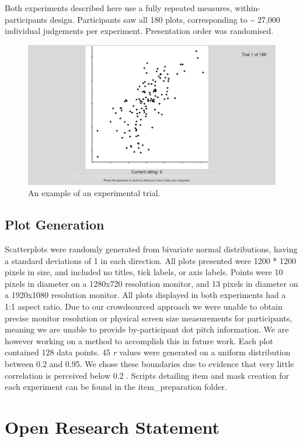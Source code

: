 \documentclass[preprint, 3p,
authoryear]{elsarticle} %
\begin{document}
Both experiments described here use a fully repeated measures,
within-participants design. Participants saw all 180 plots,
corresponding to \textasciitilde{} 27,000 individual judgements per
experiment. Presentation order was randomised.

\begin{figure}

\includegraphics[width=0.5\linewidth]{images/example-trial} \hfill{}

\caption{\label{example-trial}An example of an experimental trial.}\label{fig:example-trial}
\end{figure}

\hypertarget{plot-generation}{%
\subsection{Plot Generation}\label{plot-generation}}

Scatterplots were randomly generated from bivariate normal
distributions, having a standard deviations of 1 in each direction. All
plots presented were 1200 * 1200 pixels in size, and included no titles,
tick labels, or axis labels. Points were 10 pixels in diameter on a
1280x720 resolution monitor, and 13 pixels in diameter on a 1920x1080
resolution monitor. All plots displayed in both experiments had a 1:1
aspect ratio. Due to our crowdsourced approach we were unable to obtain
precise monitor resolution or physical screen size measurements for
participants, meaning we are unable to provide by-participant dot pitch
information. We are however working on a method to accomplish this in
future work. Each plot contained 128 data points. 45 \emph{r} values
were generated on a uniform distribution between 0.2 and 0.95. We chose
these boundaries due to evidence that very little correlation is
perceived below 0.2 \citep{bobko_1979, cleveland_1982, strahan_1978}.
Scripts detailing item and mask creation for each experiment can be
found in the item\_preparation folder.

\hypertarget{open-research-statement}{%
\section{Open Research Statement}\label{open-research-statement}}
\end{document}
